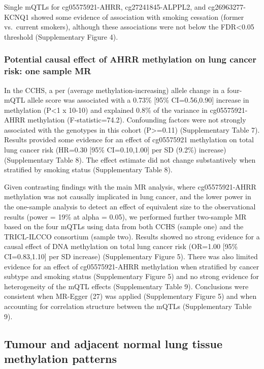 \documentclass[11pt,twoside]{bristolthesis}
\begin{document}
Single mQTLs for cg05575921-AHRR, cg27241845-ALPPL2, and cg26963277-KCNQ1 showed some evidence of association with smoking cessation (former vs.~current smokers), although these associations were not below the FDR\textless0.05 threshold (Supplementary Figure 4).

\hypertarget{potential-causal-effect-of-ahrr-methylation-on-lung-cancer-risk-one-sample-mr}{%
\subsubsection{Potential causal effect of AHRR methylation on lung cancer risk: one sample MR}\label{potential-causal-effect-of-ahrr-methylation-on-lung-cancer-risk-one-sample-mr}}

In the CCHS, a per (average methylation-increasing) allele change in a four-mQTL allele score was associated with a 0.73\% {[}95\% CI=0.56,0.90{]} increase in methylation (P\textless1 x 10-10) and explained 0.8\% of the variance in cg05575921-AHRR methylation (F-statistic=74.2). Confounding factors were not strongly associated with the genotypes in this cohort (P\textgreater=0.11) (Supplementary Table 7). Results provided some evidence for an effect of cg05575921 methylation on total lung cancer risk (HR=0.30 {[}95\% CI=0.10,1.00{]} per SD (9.2\%) increase) (Supplementary Table 8). The effect estimate did not change substantively when stratified by smoking status (Supplementary Table 8).

Given contrasting findings with the main MR analysis, where cg05575921-AHRR methylation was not causally implicated in lung cancer, and the lower power in the one-sample analysis to detect an effect of equivalent size to the observational results (power = 19\% at alpha = 0.05), we performed further two-sample MR based on the four mQTLs using data from both CCHS (sample one) and the TRICL-ILCCO consortium (sample two). Results showed no strong evidence for a causal effect of DNA methylation on total lung cancer risk (OR=1.00 {[}95\% CI=0.83,1.10{]} per SD increase) (Supplementary Figure 5). There was also limited evidence for an effect of cg05575921-AHRR methylation when stratified by cancer subtype and smoking status (Supplementary Figure 5) and no strong evidence for heterogeneity of the mQTL effects (Supplementary Table 9). Conclusions were consistent when MR-Egger (27) was applied (Supplementary Figure 5) and when accounting for correlation structure between the mQTLs (Supplementary Table 9).

\hypertarget{tumour-and-adjacent-normal-lung-tissue-methylation-patterns}{%
\subsection{Tumour and adjacent normal lung tissue methylation patterns}\label{tumour-and-adjacent-normal-lung-tissue-methylation-patterns}}
\end{document}

